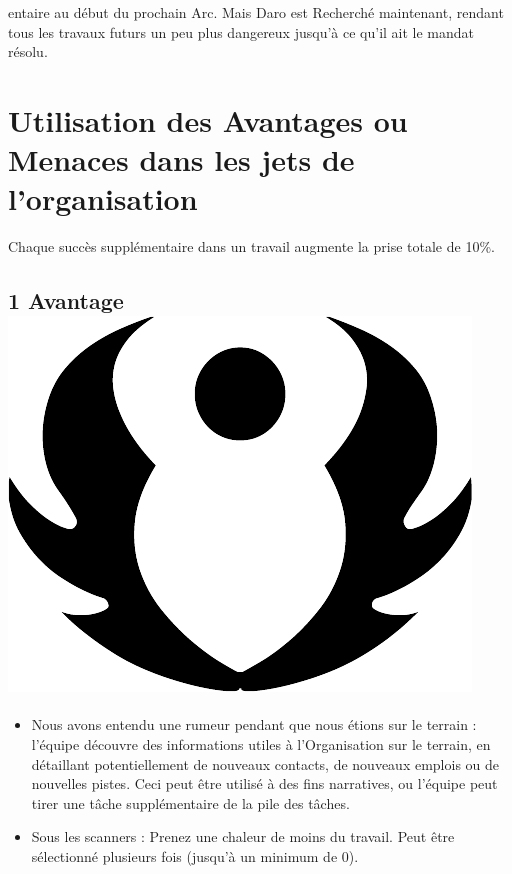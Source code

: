 \documentclass{article}
\begin{document}
entaire au début du prochain Arc. Mais Daro est Recherché maintenant, rendant tous les travaux futurs un peu plus dangereux jusqu'à ce qu'il ait le mandat résolu.

\section*{Utilisation des Avantages ou Menaces dans les jets de l’organisation}
Chaque succès supplémentaire dans un travail augmente la prise totale de 10\%.

\subsection*{1 Avantage \includegraphics[height=\fontcharht\font`\B]{../img/result_avantage_advantage}}
\begin{itemize}
	\item Nous avons entendu une rumeur pendant que nous étions sur le terrain : l'équipe découvre des informations utiles à l'Organisation sur le terrain, en détaillant potentiellement de nouveaux contacts, de nouveaux emplois ou de nouvelles pistes. Ceci peut être utilisé à des fins narratives, ou l'équipe peut tirer une tâche supplémentaire de la pile des tâches.
	\item Sous les scanners : Prenez une chaleur de moins du travail. Peut être sélectionné plusieurs fois (jusqu'à un minimum de 0).
\end{itemize}
\end{document}
